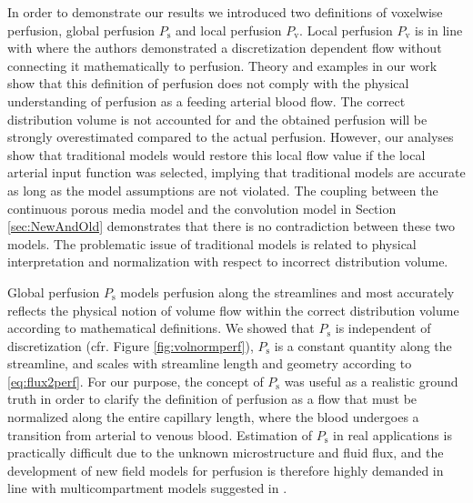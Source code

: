 \documentclass[10pt]{article}
\begin{document}
	In order to demonstrate our results we introduced two definitions of voxelwise perfusion, global perfusion $P_{\mathrm{s}}$ and local perfusion $P_{\mathrm{v}}$. Local perfusion $P_{\mathrm{v}}$ is in line with \cite{Guibert2013} where the authors demonstrated a discretization dependent flow without connecting it mathematically to perfusion. Theory and examples in our work show that this definition of perfusion does not comply with the physical understanding of perfusion as a feeding arterial blood flow. The correct distribution volume is not accounted for and the obtained perfusion will be strongly overestimated compared to the actual perfusion. However, our analyses show that traditional models would restore this local flow value if the local arterial input function was selected, implying that traditional models are accurate as long as the model assumptions are not violated. The coupling between the continuous porous media model and the convolution model in Section \ref{sec:NewAndOld} demonstrates that there is no contradiction between these two models. The problematic issue of traditional models is related to physical interpretation and normalization with respect to incorrect distribution volume.



	Global perfusion $P_{\mathrm{s}}$ models perfusion along the streamlines and most accurately reflects the physical notion of volume flow within the correct distribution volume according to mathematical definitions. We showed that $P_{\mathrm{s}}$ is independent of discretization (cfr. Figure \ref{fig:volnormperf}), $P_{\mathrm{s}}$ is a constant quantity along the streamline, and scales with streamline length and geometry according to \eqref{eq:flux2perf}.
	For our purpose, the concept of $P_{\mathrm{s}}$ was useful as a realistic ground truth in order to clarify the definition of perfusion as a flow that must be normalized along the entire capillary length, where the blood undergoes a transition from arterial to venous blood. Estimation of $P_{\mathrm{s}}$ in real applications is practically difficult due to the unknown microstructure and fluid flux, and the development of new field models for perfusion is therefore highly demanded in line with multicompartment models suggested in \cite{sourbron14,Michler2013}. 
	
\end{document}

